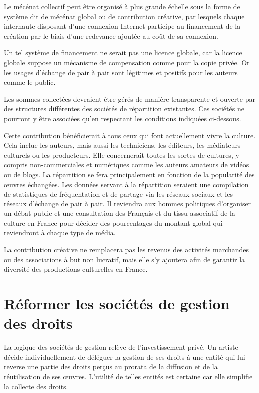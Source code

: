 \begin{mesure}
Le mécénat collectif peut être organisé à plus grande échelle sous la forme de système dit de mécénat global ou de contribution créative, par lesquels chaque internaute disposant d'une connexion Internet participe au financement de la création par le biais d'une redevance ajoutée au coût de sa connexion. 
\end{mesure}

Un tel système de financement ne serait pas une licence globale, car la licence globale suppose un mécanisme de compensation comme pour la copie privée. Or les usages d'échange de pair à pair sont légitimes et positifs pour les auteurs comme le public.

Les sommes collectées devraient être gérés de manière transparente et ouverte par des structures différentes des sociétés de répartition existantes. Ces sociétés ne pourront y être associées qu'en respectant les conditions indiquées ci-dessous. 

Cette contribution bénéficierait à tous ceux qui font actuellement vivre la culture. Cela inclue les auteurs, mais aussi les techniciens, les éditeurs, les médiateurs culturels ou les producteurs. Elle concernerait toutes les sortes de cultures, y compris non-commerciales et numériques comme les auteurs amateurs de vidéos ou de blogs. La répartition se fera principalement en fonction de la popularité des œuvres échangées. Les données servant à la répartition seraient une compilation de statistiques de fréquentation et de partage via les réseaux sociaux et les réseaux d'échange de pair à pair. Il reviendra aux hommes politiques d'organiser un débat public et une consultation des Français et du tissu associatif de la culture en France pour décider des pourcentages du montant global qui reviendront à chaque type de média. 

La contribution créative ne remplacera pas les revenus des activités marchandes ou des associations à but non lucratif, mais elle s'y ajoutera afin de garantir la diversité des productions culturelles en France.

\section{Réformer les sociétés de gestion des droits}

La logique des sociétés de gestion relève de l'investissement privé. Un artiste décide individuellement de déléguer la gestion de ses droits à une entité qui lui reverse une partie des droits perçus au prorata de la diffusion et de la réutilisation de ses œuvres. L'utilité de telles entités est certaine car elle simplifie la collecte des droits. 

